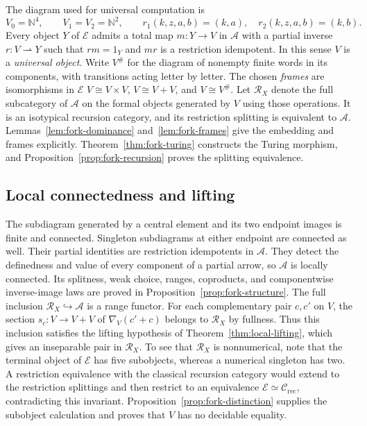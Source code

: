 \documentclass[11pt]{article}
\newcommand{\N}{\mathbb N}
\begin{document}
The diagram used for universal computation is
\begin{equation}\label{eq:universal-fork}
 V_0=\N^4,\qquad V_1=V_2=\N^2,\qquad
 r_1(k,z,a,b)=(k,a),\quad r_2(k,z,a,b)=(k,b).
\end{equation}
Every object $Y$ of $\mathcal E$ admits a total map $m:Y\to V$ in
$\mathcal A$ with a partial
inverse $r:V\rightharpoonup Y$ such that $rm=1_Y$ and
$mr$ is a restriction idempotent. In this sense $V$ is a
\emph{universal object}.
Write $V^\#$ for the diagram of nonempty finite words in its
components, with transitions acting letter by letter.
The chosen \emph{frames} are isomorphisms in $\mathcal E$
$V\cong V\times V$, $V\cong V+V$, and $V\cong V^\#$.
Let $\mathscr R_X$ denote the full subcategory of $\mathcal A$
on the formal objects generated by $V$ using those operations.
It is an isotypical recursion category, and its restriction
splitting is equivalent to $\mathcal A$.
Lemmas~\ref{lem:fork-dominance} and~\ref{lem:fork-frames} give the
embedding and frames explicitly. Theorem~\ref{thm:fork-turing}
constructs the Turing morphism, and
Proposition~\ref{prop:fork-recursion} proves the splitting equivalence.

\subsection{Local connectedness and lifting}

The subdiagram generated by a central element and its two endpoint
images is finite and connected. Singleton subdiagrams at either endpoint
are connected as well. Their partial identities are restriction
idempotents in $\mathcal A$. They detect the definedness and value
of every component of a partial arrow, so $\mathcal A$ is locally
connected. Its splitness, weak choice, ranges, coproducts, and
componentwise inverse-image laws are proved in
Proposition~\ref{prop:fork-structure}.
The full inclusion $\mathscr R_X\hookrightarrow\mathcal A$ is a
range functor.
For each complementary pair $c,c'$ on $V$, the section
$s_c:V\to V+V$ of $\nabla_V(c'+c)$ belongs to $\mathscr R_X$
by fullness. Thus this inclusion satisfies the lifting hypothesis of
Theorem~\ref{thm:local-lifting}, which gives an inseparable pair in
$\mathscr R_X$.
To see that $\mathscr R_X$ is nonnumerical, note that the terminal
object of $\mathcal E$ has five subobjects,
whereas a numerical singleton has two.
A restriction equivalence with the classical recursion category
would extend to the restriction splittings and then restrict to an
equivalence $\mathcal E\simeq\mathcal C_{\mathrm{rec}}$, contradicting
this invariant. Proposition~\ref{prop:fork-distinction} supplies the
subobject calculation and proves that $V$ has no decidable equality.
\end{document}
